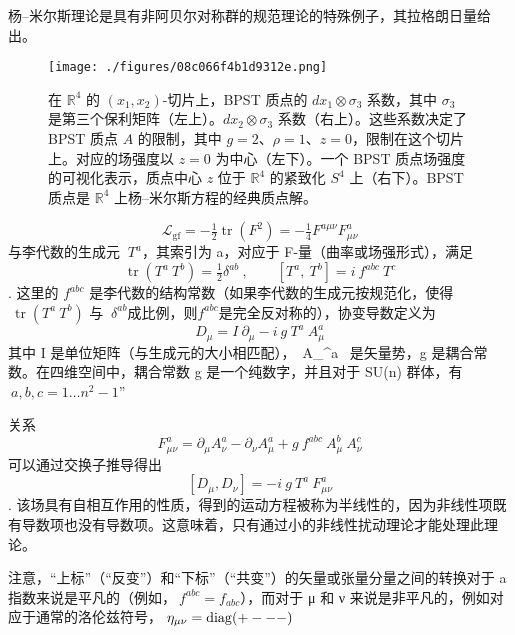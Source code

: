 杨–米尔斯理论是具有非阿贝尔对称群的规范理论的特殊例子，其拉格朗日量给出。
\begin{figure}[ht]
\centering
\texttt{[image: ./figures/08c066f4b1d9312e.png]}
\caption{在 \( \mathbb{R}^4 \) 的 \( (x_1, x_2) \)-切片上，BPST 质点的 \( dx_1 \otimes \sigma_3 \) 系数，其中 \( \sigma_3 \) 是第三个保利矩阵（左上）。\( dx_2 \otimes \sigma_3 \) 系数（右上）。这些系数决定了 BPST 质点 \( A \) 的限制，其中 \( g=2 \)、\( \rho=1 \)、\( z=0 \)，限制在这个切片上。对应的场强度以 \( z=0 \) 为中心（左下）。一个 BPST 质点场强度的可视化表示，质点中心 \( z \) 位于 \( \mathbb{R}^4 \) 的紧致化 \( S^4 \) 上（右下）。BPST 质点是 \( \mathbb{R}^4 \) 上杨–米尔斯方程的经典质点解。} \label{fig_Yang_1}
\end{figure}
\[\displaystyle \ {\mathcal {L}}_{\mathrm {gf} }=-{\tfrac {1}{2}}\operatorname {tr} (F^{2})=-{\tfrac {1}{4}}F^{a\mu \nu }F_{\mu \nu }^{a}~\] 
与李代数的生成元 \(\displaystyle \ T^{a}\)，其索引为 a，对应于 F-量（曲率或场强形式），满足
\[\displaystyle \ \operatorname {tr} \left(T^{a}\ T^{b}\right)={\tfrac {1}{2}}\delta ^{ab}\ ,\qquad \left[T^{a},\ T^{b}\right]=i\ f^{abc}\ T^{c}~\]. 
这里的 \(f^{abc}\) 是李代数的结构常数（如果李代数的生成元按规范化，使得 \(\displaystyle \ \operatorname {tr} (T^{a}\ T^{b})\) 与 \(\displaystyle \ \delta ^{ab}\)成比例，则\(f^{abc}\)是完全反对称的），协变导数定义为
\[\displaystyle \ D_{\mu }=I\ \partial _{\mu }-i\ g\ T^{a}\ A_{\mu }^{a}~\]
其中 I 是单位矩阵（与生成元的大小相匹配），{\displaystyle \ A_{\mu }^{a}\ } 是矢量势，g 是耦合常数。在四维空间中，耦合常数 g 是一个纯数字，并且对于 SU(n) 群体，有\(\displaystyle \ a,b,c=1\ldots n^{2}-1\)”

关系
\[\displaystyle \ F_{\mu \nu }^{a}=\partial _{\mu }A_{\nu }^{a}-\partial _{\nu }A_{\mu }^{a}+g\ f^{abc}\ A_{\mu }^{b}\ A_{\nu }^{c}~\] 
可以通过交换子推导得出
\[\displaystyle \ \left[D_{\mu },D_{\nu }\right]=-i\ g\ T^{a}\ F_{\mu \nu }^{a}~\]. 
该场具有自相互作用的性质，得到的运动方程被称为半线性的，因为非线性项既有导数项也没有导数项。这意味着，只有通过小的非线性扰动理论才能处理此理论。

注意，“上标”（“反变”）和“下标”（“共变”）的矢量或张量分量之间的转换对于 a 指数来说是平凡的（例如，\(\displaystyle \ f^{abc}=f_{abc}\)），而对于 μ 和 ν 来说是非平凡的，例如对应于通常的洛伦兹符号，\(\displaystyle \ \eta _{\mu \nu }={\rm {diag}}(+---)\)

